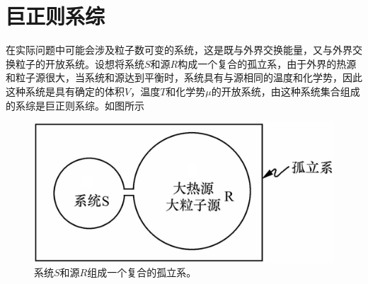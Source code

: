 \documentclass[UTF8,oneside,openany]{ctexbook}
\begin{document}
\section{巨正则系综}
在实际问题中可能会涉及粒子数可变的系统，这是既与外界交换能量，又与外界交换粒子的开放系统。设想将系统$S$和源$R$构成一个复合的孤立系，由于外界的热源和粒子源很大，当系统和源达到平衡时，系统具有与源相同的温度和化学势，因此这种系统是具有确定的体积$V$，温度$T$和化学势$\mu$的开放系统，由这种系统集合组成的系综是巨正则系综。如图所示
\begin{figure}[ht]
	\centering
	\includegraphics[scale=0.2]{gce.png}
	\caption{系统$S$和源$R$组成一个复合的孤立系。}
\end{figure}
\end{document}
